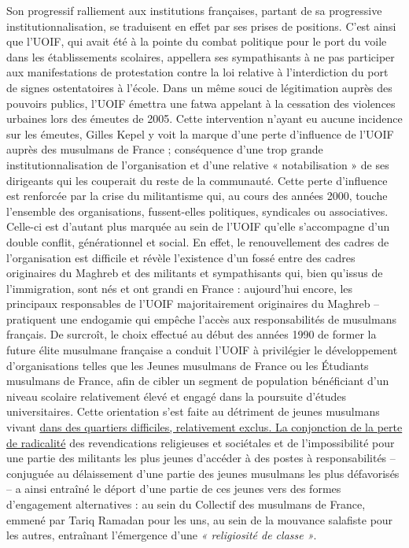 Son progressif ralliement aux institutions françaises, partant de sa
progressive institutionnalisation, se traduisent en effet par ses prises
de positions. C'est ainsi que l'UOIF, qui avait été à la pointe du
combat politique pour le port du voile dans les établissements
scolaires, appellera ses sympathisants à ne pas participer aux
manifestations de protestation contre la loi relative à l'interdiction
du port de signes ostentatoires à l'école. Dans un même souci de
légitimation auprès des pouvoirs publics, l'UOIF émettra une fatwa
appelant à la cessation des violences urbaines lors des émeutes de 2005.
Cette intervention n'ayant eu aucune incidence sur les émeutes, Gilles
Kepel y voit la marque d'une perte d'influence de l'UOIF auprès des
musulmans de France ; conséquence d'une trop grande
institutionnalisation de l'organisation et d'une relative
« notabilisation » de ses dirigeants qui les couperait du reste de la
communauté.
Cette perte d'influence est renforcée par la crise du militantisme qui,
au cours des années 2000, touche l'ensemble des organisations,
fussent-elles politiques, syndicales ou associatives. Celle-ci est
d'autant plus marquée au sein de l'UOIF qu'elle s'accompagne d'un double
conflit, générationnel et social. En effet, le renouvellement des cadres
de l'organisation est difficile et révèle l'existence d'un fossé entre
des cadres originaires du Maghreb et des militants et sympathisants qui,
bien qu'issus de l'immigration, sont nés et ont grandi en France :
aujourd'hui encore, les principaux responsables de l'UOIF
  majoritairement originaires du Maghreb -- pratiquent une endogamie qui
  empêche l'accès aux responsabilités de musulmans français. De
  surcroît, le choix effectué au début des années 1990 de former la
  future élite musulmane française a conduit l'UOIF à privilégier le
  développement d'organisations telles que les Jeunes musulmans de
  France ou les Étudiants musulmans de France, afin de cibler un segment
  de population bénéficiant d'un niveau scolaire relativement élevé et
  engagé dans la poursuite d'études universitaires. Cette orientation
  s'est faite au détriment de jeunes musulmans vivant \underline{dans
  des quartiers difficiles, relativement exclus. La conjonction de la
  perte de radicalité} des revendications religieuses et sociétales et de l'impossibilité pour
une partie des militants les plus jeunes d'accéder à des postes à
responsabilités -- conjuguée au délaissement d'une partie des jeunes
musulmans les plus défavorisés -- a ainsi entraîné le déport d'une
partie de ces jeunes vers des formes d'engagement alternatives : au sein
du Collectif des musulmans de France, emmené par Tariq Ramadan pour les
uns, au sein de la mouvance salafiste pour les autres, entraînant
l'émergence d'une \emph{« religiosité de classe »}.



